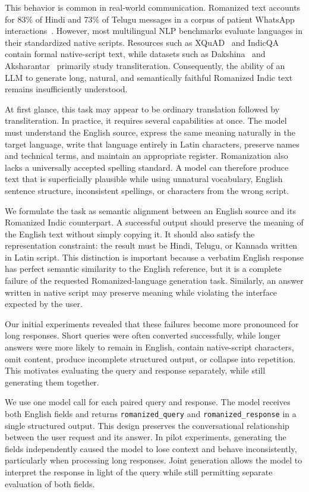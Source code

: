 This behavior is common in real-world communication. Romanized text accounts
for 83\% of Hindi and 73\% of Telugu messages in a corpus of patient WhatsApp
interactions~\cite{khullar2025scriptgap}. However, most multilingual NLP
benchmarks evaluate languages in their standardized native scripts. Resources
such as XQuAD~\cite{artetxe2020xquad} and
IndicQA~\cite{doddapaneni2023indicqa} contain formal native-script text, while
datasets such as Dakshina~\cite{roark2020dakshina} and
Aksharantar~\cite{madhani2023aksharantar} primarily study transliteration.
Consequently, the ability of an LLM to generate long, natural, and semantically
faithful Romanized Indic text remains insufficiently understood.

At first glance, this task may appear to be ordinary translation followed by
transliteration. In practice, it requires several capabilities at once. The
model must understand the English source, express the same meaning naturally in
the target language, write that language entirely in Latin characters, preserve
names and technical terms, and maintain an appropriate register. Romanization
also lacks a universally accepted spelling standard. A model can therefore
produce text that is superficially plausible while using unnatural vocabulary,
English sentence structure, inconsistent spellings, or characters from the
wrong script.

We formulate the task as semantic alignment between an English source and its
Romanized Indic counterpart. A successful output should preserve the meaning of
the English text without simply copying it. It should also satisfy the
representation constraint: the result must be Hindi, Telugu, or Kannada written
in Latin script. This distinction is important because a verbatim English
response has perfect semantic similarity to the English reference, but it is a
complete failure of the requested Romanized-language generation task.
Similarly, an answer written in native script may preserve meaning while
violating the interface expected by the user.

Our initial experiments revealed that these failures become more pronounced for
long responses. Short queries were often converted successfully, while longer
answers were more likely to remain in English, contain native-script
characters, omit content, produce incomplete structured output, or collapse
into repetition. This motivates evaluating the query and response separately,
while still generating them together.

We use one model call for each paired query and response. The model receives
both English fields and returns
\texttt{romanized\_query} and
\texttt{romanized\_response} in a single structured output. This design
preserves the conversational relationship between the user request and its
answer. In pilot experiments, generating the fields independently caused the
model to lose context and behave inconsistently, particularly when processing
long responses. Joint generation allows the model to interpret the response in
light of the query while still permitting separate evaluation of both fields.

